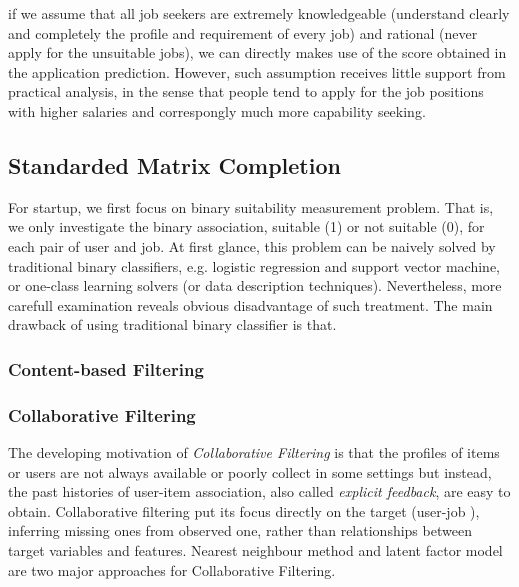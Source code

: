 \documentclass{article} %
\begin{document}
if we assume that all job seekers are extremely knowledgeable (understand
clearly and completely the profile and requirement of every job) and rational
(never apply for the unsuitable jobs), we can directly makes use of the score
obtained in the application prediction. However, such assumption receives
little support from practical analysis, in the sense that people tend to apply
for the job positions with higher salaries and correspongly much more
capability seeking.

\subsection{Standarded Matrix Completion}
For startup, we first focus on binary suitability measurement problem. That
is, we only investigate the binary association, suitable (1) or not suitable
(0), for each pair of user and job. 
At first glance, this problem can be naively solved by traditional binary
classifiers, e.g. logistic regression and support vector machine, or one-class
learning solvers (or data description techniques).
Nevertheless, more carefull examination reveals obvious disadvantage of such
treatment. The main drawback of using traditional binary classifier is that.

\subsubsection{Content-based Filtering}

\subsubsection{Collaborative Filtering}
The developing motivation of {\it Collaborative Filtering} is that the
profiles of items or users are not always available or poorly collect in
some settings but instead, the past histories of user-item association, also called {\it
    explicit feedback}, are easy to obtain. Collaborative filtering put its
focus directly on the target (user-job ), inferring missing ones from observed
one, rather than relationships between target
variables and features. Nearest neighbour method and latent factor model are
two major approaches for Collaborative Filtering.

\end{document}
